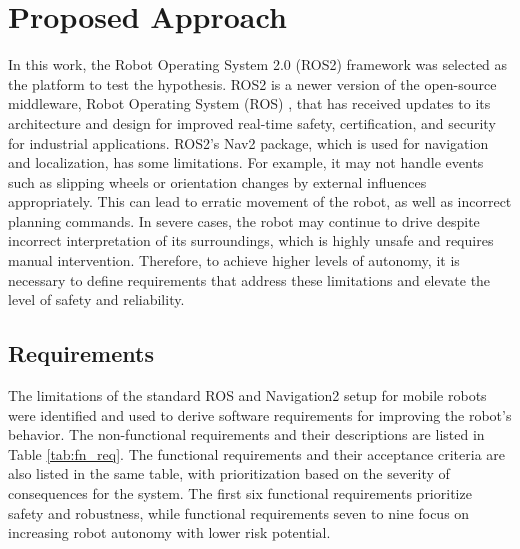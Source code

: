 \documentclass[letterpaper, 10pt, conference]{ieeeconf}
\begin{document}

\section{Proposed Approach}
\label{sec:ProposedApproach}

In this work, the Robot Operating System 2.0 (ROS2) \cite{ros2022} framework was selected as the platform to test the hypothesis. ROS2 is a newer version of the open-source middleware, Robot Operating System (ROS) \cite{quigley2009}, that has received updates to its architecture and design for improved real-time safety, certification, and security for industrial applications. ROS2's Nav2 package, which is used for navigation and localization, has some limitations. For example, it may not handle events such as slipping wheels or orientation changes by external influences appropriately. This can lead to erratic movement of the robot, as well as incorrect planning commands. In severe cases, the robot may continue to drive despite incorrect interpretation of its surroundings, which is highly unsafe and requires manual intervention. Therefore, to achieve higher levels of autonomy, it is necessary to define requirements that address these limitations and elevate the level of safety and reliability.

\subsection{Requirements}

The limitations of the standard ROS and Navigation2 setup for mobile robots were identified and used to derive software requirements for improving the robot's behavior. The non-functional requirements and their descriptions are listed in Table \ref{tab:fn_req}. The functional requirements and their acceptance criteria are also listed in the same table, with prioritization based on the severity of consequences for the system. The first six functional requirements prioritize safety and robustness, while functional requirements seven to nine focus on increasing robot autonomy with lower risk potential.
\end{document}

